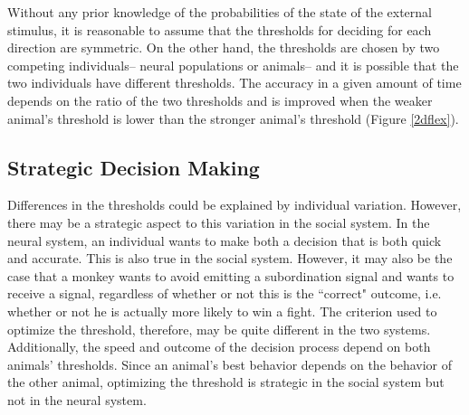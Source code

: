 \documentclass{article}
\begin{document}
Without any prior knowledge of the probabilities of the state of the external stimulus, it is reasonable to assume that the thresholds for deciding for each direction are symmetric.  On the other hand, the thresholds are chosen by two competing individuals-- neural populations or animals-- and it is possible that the two individuals have different thresholds.  The accuracy in a given amount of time depends on the ratio of the two thresholds and is improved when the weaker animal's threshold is lower than the stronger animal's threshold (Figure \ref{2dflex}).  

\subsection{Strategic Decision Making }
Differences in the thresholds could be explained by individual variation.  However, there may be a strategic aspect to this variation in the social system.  In the neural system, an individual wants to make both a decision that is both quick and accurate.  This is also true in the social system.  However, it may also be the case that a monkey wants to avoid emitting a subordination signal and wants to receive a signal, regardless of whether or not this is the ``correct" outcome, i.e. whether or not he is actually more likely to win a fight.  The criterion used to optimize the threshold, therefore, may be quite different in the two systems.  Additionally, the speed and outcome of the decision process depend on both animals' thresholds.  Since an animal's best behavior depends on the behavior of the other animal, optimizing the threshold is strategic in the social system but not in the neural system.  
\end{document}
